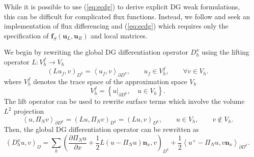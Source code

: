 \documentclass[preprint,10pt]{article}
\theoremstyle{definition}
\theoremstyle{lemma}
\theoremstyle{theorem}
\theoremstyle{assumption}
\newcommand{\pd}[2]{\frac{\partial#1}{\partial#2}}
\newcommand{\LRp}[1]{\left( #1 \right)}
\newcommand{\LRa}[1]{\left\langle #1 \right\rangle}
\newcommand{\LRc}[1]{\left\{ #1 \right\}}
\begin{document}
While it is possible to use (\ref{eq:ecdg}) to derive explicit DG weak formulations, this can be difficult for complicated flux functions.  Instead, we follow \cite{gassner2016split, chen2017entropy} and seek an implementation of flux differencing and (\ref{eq:ecdg}) which requires only the specification of $\bm{f}_S(\bm{u}_L,\bm{u}_R)$ and local matrices.  

We begin by rewriting the global DG differentiation operator $D^x_h$ using the lifting operator  ${L}: V_h^f\rightarrow V_h$
\[
\LRp{{L} u_f,v}_{D^k} = \LRa{u_f,v}_{\partial D^k}, \qquad u_f \in V_h^f, \qquad \forall v\in V_h.
\]
where $V_h^f$ denotes the trace space of the approximation space $V_h$
\[
V_h^f = \LRc{ \left.u\right|_{\partial D^k}, \quad u \in V_h}.
\]
The lift operator can be used to rewrite surface terms which involve the volume $L^2$ projection
\[
\LRa{u,\Pi_Nv}_{\partial D^k} = \LRp{Lu,\Pi_N v}_{D^k} = \LRp{Lu,v}_{D^k}, \qquad u\in V_h, \qquad v\not\in V_h.  
\]
Then, the global DG differentiation operator can be rewritten as 
\begin{equation}
\LRp{D^x_h u,v}_{\Omega} = \sum_k \LRp{\pd{ \Pi_N u}{x} + \frac{1}{2}L\LRp{u-\Pi_N u}\bm{n}_x,v}_{D^k} + \frac{1}{2}{\LRa{{u^+ - \Pi_N u}, v\bm{n}_x}_{\partial D^k}}.
\label{eq:dgd_globalimplement}
\end{equation}
\end{document}
